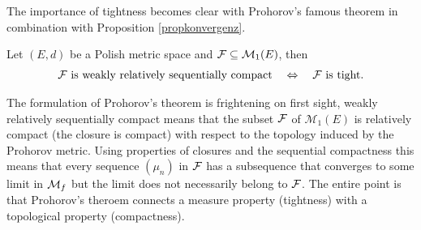 The importance of tightness becomes clear with Prohorov's famous theorem in combination with Proposition \ref{propkonvergenz}.
\begin{laussagewerkzeug}
\begin{theorem}[Prohorov]\label{Prohorov}
	Let $(E,d)$ be a Polish metric space and $\mathcal{F} \subseteq \mathcal{M}_1(E)$, then
	\begin{align*}
		 \mathcal{F} \text{ is weakly relatively sequentially compact}\quad \Leftrightarrow \quad \mathcal{F} \text{ is tight}.
	\end{align*}
\end{theorem}
\end{laussagewerkzeug}
The formulation of Prohorov's theorem is frightening on first sight, weakly relatively sequentially compact means that the subset $\mathcal{F}$ of $\mathcal M_1(E)$ is relatively compact (the closure is compact) with respect to the topology induced by the Prohorov metric. Using properties of closures and the sequential compactness this means that every sequence $(\mu_n)$ in $\mathcal{F}$ has a subsequence that converges to some limit in $\mathcal{M}_f$ but the limit does not necessarily belong to $\mathcal{F}$. The entire point is that Prohorov's theroem connects a measure property (tightness) with a topological property (compactness).
